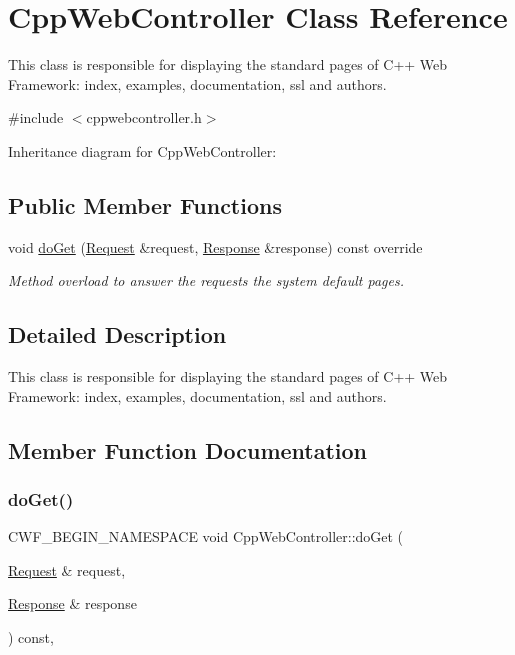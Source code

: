 \hypertarget{class_cpp_web_controller}{}\section{Cpp\+Web\+Controller Class Reference}
\label{class_cpp_web_controller}


This class is responsible for displaying the standard pages of C++ Web Framework\+: index, examples, documentation, ssl and authors.  




{\ttfamily \#include $<$cppwebcontroller.\+h$>$}



Inheritance diagram for Cpp\+Web\+Controller\+:
\subsection*{Public Member Functions}
\begin{DoxyCompactItemize}
\item 
void \hyperlink{class_cpp_web_controller_a2555abf02a8e377c4f209675831d1a04}{do\+Get} (\hyperlink{class_request}{Request} \&request, \hyperlink{class_response}{Response} \&response) const override
\begin{DoxyCompactList}\small\item\em Method overload to answer the requests the system default pages. \end{DoxyCompactList}\end{DoxyCompactItemize}


\subsection{Detailed Description}
This class is responsible for displaying the standard pages of C++ Web Framework\+: index, examples, documentation, ssl and authors. 

\subsection{Member Function Documentation}
\mbox{\label{class_cpp_web_controller_a2555abf02a8e377c4f209675831d1a04}} 
\subsubsection{\texorpdfstring{do\+Get()}{doGet()}}
{\footnotesize\ttfamily C\+W\+F\+\_\+\+B\+E\+G\+I\+N\+\_\+\+N\+A\+M\+E\+S\+P\+A\+CE void Cpp\+Web\+Controller\+::do\+Get (\begin{DoxyParamCaption}\item[{\hyperlink{class_request}{Request} \&}]{request,  }\item[{\hyperlink{class_response}{Response} \&}]{response }\end{DoxyParamCaption}) const\hspace{0.3cm}{\ttfamily [override]}, {\ttfamily [virtual]}}




